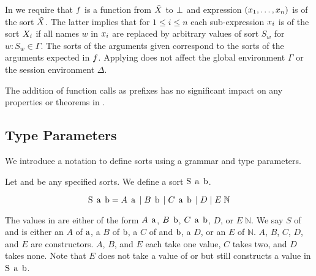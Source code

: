 In \RSideEffect we require that $f$ is a function from $\tilde{X}$ to $\bot$ and expression $\left(x_1,\ldots,x_n\right)$ is of the sort $\tilde{X}$.
The latter implies that for $1 \leq i \leq n$ each sub-expression $x_i$ is of the sort $X_i$ if all names $w$ in $x_i$ are replaced by arbitrary values of sort $S_w$ for $w:S_w \in \Gamma$.
The sorts of the arguments given correspond to the sorts of the arguments expected in $f$.
Applying \RSideEffect does not affect the global environment $\Gamma$ or the session environment $\Delta$.

The addition of function calls as prefixes has no significant impact on any properties or theorems in \cite{PetersEtal21}.

\subsection{Type Parameters}
We introduce a notation to define sorts using a grammar and type parameters.

Let \TypeParamA and \TypeParamB be any specified sorts.
We define a sort $\operatorname{S}\;\operatorname{a}\;\operatorname{b}$.

\[\operatorname{S}\;\operatorname{a}\;\operatorname{b} = A\;\operatorname{a} \; | \; B\;\operatorname{b} \; | \; C\;\operatorname{a}\;\operatorname{b} \; | \; D \; | \; E\;\mathbb{N}\]

The values in \Sab are either of the form $A\;\operatorname{a}$, $B\;\operatorname{b}$, $C\;\operatorname{a}\;\operatorname{b}$, $D$, or $E\;\mathbb{N}$.
We say $S$ of \TypeParamA and \TypeParamB is either an $A$ of $\operatorname{a}$, a $B$ of $\operatorname{b}$, a $C$ of \TypeParamA and $\operatorname{b}$, a $D$, or an $E$ of $\mathbb{N}$.
$A$, $B$, $C$, $D$, and $E$ are constructors.
$A$, $B$, and $E$ each take one value, $C$ takes two, and $D$ takes none.
Note that $E$ does not take a value of \TypeParamA or \TypeParamB but still constructs a value in $\operatorname{S}\;\operatorname{a}\;\operatorname{b}$.
